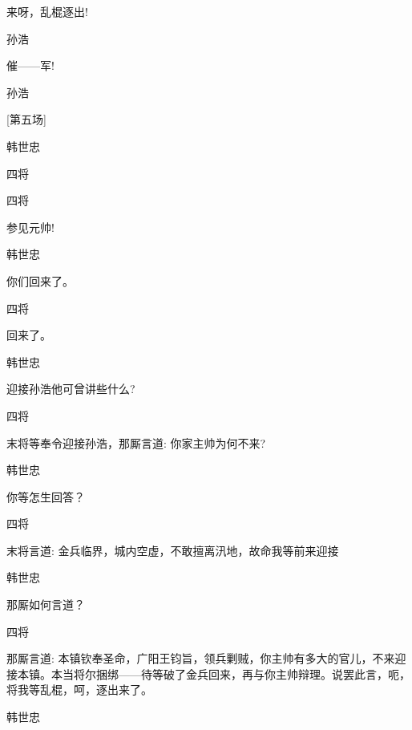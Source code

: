 {{{{来呀，乱棍逐出!}

{孙浩\hspace{30pt}~

催------军!}

{孙浩

 }

{{[}第五场{]}}

{韩世忠

 }

{四将\hspace{30pt}~

 }

{四将\hspace{30pt}~

参见元帅!}

{韩世忠\hspace{20pt}~

你们回来了。}

{四将\hspace{30pt}~

回来了。}

{韩世忠\hspace{20pt}~

迎接孙浩他可曾讲些什么?}

{四将\hspace{30pt}~

末将等奉令迎接孙浩，那厮言道: 你家主帅为何不来?}

{韩世忠\hspace{20pt}~

你等怎生回答？}

{四将

末将言道: 金兵临界，城内空虚，不敢擅离汛地，故命我等前来迎接}

{韩世忠\hspace{20pt}~

那厮如何言道？}

{四将

那厮言道: 本镇钦奉圣命，广阳王钧旨，领兵剿贼，你主帅有多大的官儿，不来迎接本镇。本当将尔捆绑------待等破了金兵回来，再与你主帅辩理。说罢此言，呃，将我等乱棍，呵，逐出来了。}

{韩世忠\hspace{20pt}~

}}}}
